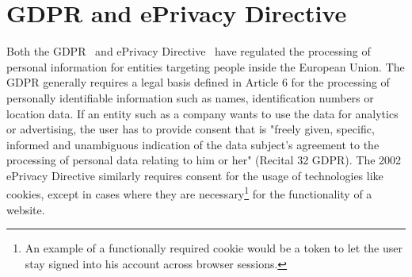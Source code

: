 \section{GDPR and ePrivacy Directive}
Both the GDPR~\cite{gdpr2016} and ePrivacy Directive~\cite{privacydirective2016} have regulated the processing of personal information for entities targeting people inside the European Union.
The GDPR generally requires a legal basis defined in Article 6 for the processing of personally identifiable information such as names, identification numbers or location data.
If an entity such as a company wants to use the data for analytics or advertising, the user has to provide consent that is "freely given, specific, informed and unambiguous indication of the data subject's agreement to the processing of personal data relating to him or her" (Recital 32 GDPR).
The 2002 ePrivacy Directive similarly requires consent for the usage of technologies like cookies, except in cases where they are necessary\footnote{An example of a functionally required cookie would be a token to let the user stay signed into his account across browser sessions.} for the functionality of a website.